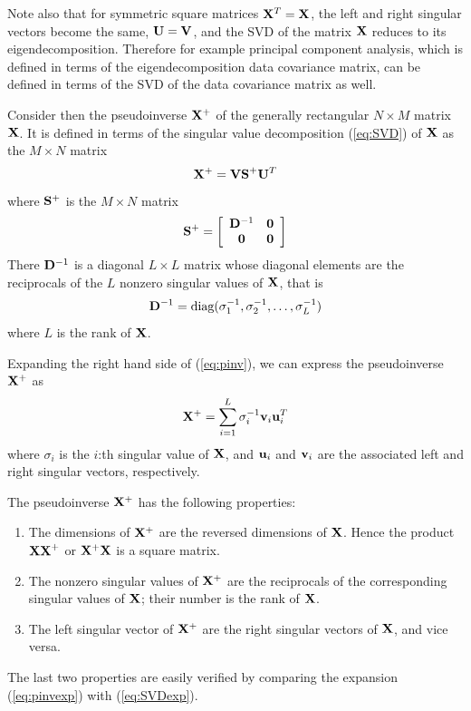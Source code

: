 \documentclass[10pt]{article}
\begin{document}
\begin{enumerate}
Note also that for symmetric square matrices ${\bf X}^T = {\bf X}$, the left and
right singular vectors become the same, ${\bf U} = {\bf V}$, and the SVD of the matrix
${\bf X}$ reduces to its eigendecomposition. Therefore for example principal component
analysis, which is defined in terms of the eigendecomposition data covariance matrix,
can be defined in terms of the SVD of the data covariance matrix as well.

Consider then the pseudoinverse ${\bf X}^+$ of the generally rectangular $N \times M$
matrix ${\bf X}$. It is defined in terms of the singular value decomposition
(\ref{eq:SVD}) of ${\bf X}$ as the $M \times N$ matrix
%
\begin{equation}
{\bf X}^+ = {\bf VS}^+{\bf U}^T
\label{eq:pinv}
\end{equation}
%
where ${\bf S}^+$ is the $M \times N$ matrix
%
\begin{equation}
{\bf S}^+ = \left[ \begin{array}{cc}
{\bf D}^{-1} & {\bf 0} \\
{\bf 0} & {\bf 0} \end{array} \right]
\label{eq:Splus}
\end{equation}
%
There ${\bf D}^{-1}$ is a diagonal $L \times L$ matrix whose diagonal elements are
the reciprocals of the $L$ nonzero singular values of ${\bf X}$, that is
%
\begin{equation}
{\bf D}^{-1} = \mbox{diag}(\sigma_1^{-1},\sigma_2^{-1},\ldots,\sigma_L^{-1})
\label{eq:Dinv}
\end{equation}
%
where $L$ is the rank of ${\bf X}$.

Expanding the right hand side of (\ref{eq:pinv}), we can express the pseudoinverse
${\bf X}^+$ as
%
\begin{equation}
{\bf X}^+ = \sum_{i=1}^L \sigma_i^{-1} {\bf v}_i {\bf u}_i^T
\label{eq:pinvexp}
\end{equation}
%
where $\sigma_i$ is the $i$:th singular value of ${\bf X}$, and ${\bf u}_i$ and
${\bf v}_i$ are the associated left and right singular vectors, respectively.

The pseudoinverse ${\bf X}^+$ has the following properties:
%
\begin{enumerate}
\item  The dimensions of ${\bf X}^+$ are the reversed dimensions of ${\bf X}$.
Hence the product ${\bf XX}^+$ or ${\bf X}^+{\bf X}$ is a square matrix.
\item The nonzero singular values of ${\bf X}^+$ are the reciprocals of the
corresponding singular values of ${\bf X}$; their number is the rank of ${\bf X}$.
\item The left singular vector of ${\bf X}^+$ are the right singular vectors of
${\bf X}$, and vice versa.
\end{enumerate}
%
The last two properties are easily verified by comparing the expansion
(\ref{eq:pinvexp}) with (\ref{eq:SVDexp}).


\end{enumerate}
\end{document}
